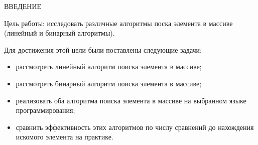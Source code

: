 \begin{center}
    \MakeUppercase{\large Введение}
\end{center}

Цель работы: исследовать различные алгоритмы поска элемента в массиве (линейный и бинарный алгоритмы).

\vspace{0.25cm}
Для достижения этой цели были поставлены следующие задачи:

\begin{itemize}

\item рассмотреть линейный алгоритм поиска элемента в массиве;

\item рассмотреть бинарный алгоритм поиска элемента в массиве;

\item реализовать оба алгоритма поиска элемента в массиве на выбранном языке программирования;

\item сравнить эффективность этих алгоритмов по числу сравнений до нахождения искомого элемента на практике.

\end{itemize}

\newpage